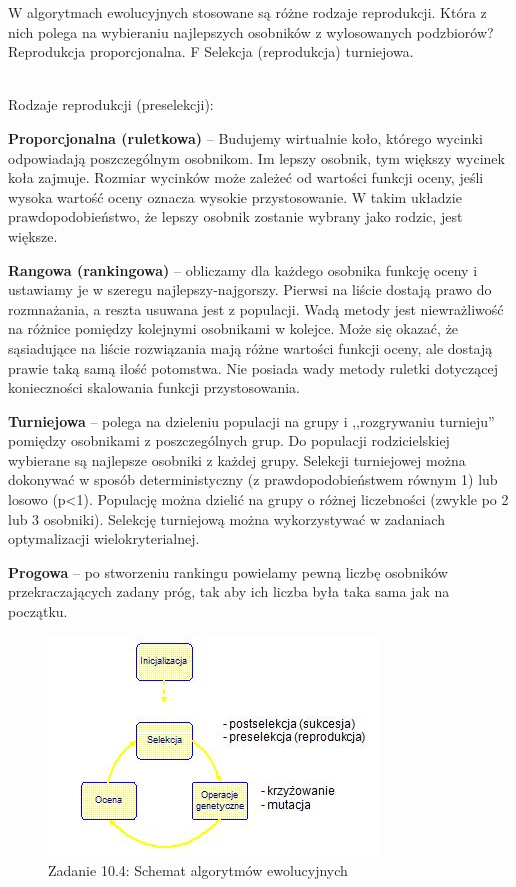 \answer
{W algorytmach ewolucyjnych stosowane są różne rodzaje reprodukcji. Która z nich polega na wybieraniu najlepszych osobników z wylosowanych podzbiorów?}
{Reprodukcja proporcjonalna.}
{F}
{Selekcja (reprodukcja) turniejowa.}
{ \\
Rodzaje reprodukcji (preselekcji):

\textbf{Proporcjonalna (ruletkowa)} -- Budujemy wirtualnie koło, którego wycinki odpowiadają poszczególnym osobnikom. Im lepszy osobnik, tym większy wycinek koła zajmuje. Rozmiar wycinków może zależeć od wartości funkcji oceny, jeśli wysoka wartość oceny oznacza wysokie przystosowanie. W takim układzie prawdopodobieństwo, że lepszy osobnik zostanie wybrany jako rodzic, jest większe.

\textbf{Rangowa (rankingowa)} -- obliczamy dla każdego osobnika funkcję oceny i ustawiamy je w szeregu najlepszy-najgorszy. Pierwsi na liście dostają prawo do rozmnażania, a reszta usuwana jest z populacji. Wadą metody jest niewrażliwość na różnice pomiędzy kolejnymi osobnikami w kolejce. Może się okazać, że sąsiadujące na liście rozwiązania mają różne wartości funkcji oceny, ale dostają prawie taką samą ilość potomstwa. Nie posiada wady metody ruletki dotyczącej konieczności skalowania funkcji przystosowania.

\textbf{Turniejowa} -- polega na dzieleniu populacji na grupy i ,,rozgrywaniu turnieju'' pomiędzy osobnikami z poszczególnych grup. Do populacji rodzicielskiej wybierane są najlepsze osobniki z każdej grupy. Selekcji turniejowej można dokonywać w sposób deterministyczny (z prawdopodobieństwem równym 1) lub losowo (p<1). Populację można dzielić na grupy o różnej liczebności (zwykle po 2 lub 3 osobniki). Selekcję turniejową można wykorzystywać w zadaniach optymalizacji wielokryterialnej.

\textbf{Progowa} -- po stworzeniu rankingu powielamy pewną liczbę osobników przekraczających zadany próg, tak aby ich liczba była taka sama jak na początku.

\begin{figure}[h]
\centering
\includegraphics[width=.4\linewidth]{10/algo_ewolucyjne_schemat}
\caption*{Zadanie 10.4: Schemat algorytmów ewolucyjnych}
\end{figure}
}




